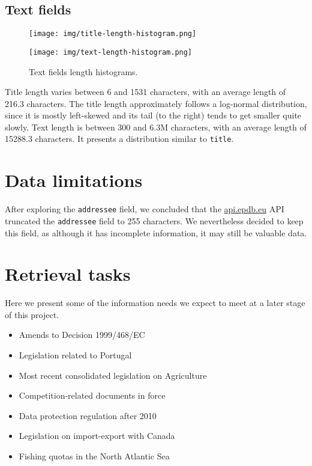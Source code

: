 \documentclass[sigconf, authorversion]{acmart}
\begin{document}
\subsection{Text fields}

\begin{figure}[h]
    \centering
    \begin{minipage}[t]{0.5\linewidth}
        \centering
        \texttt{[image: img/title-length-histogram.png]}
    \end{minipage}%
    \begin{minipage}[t]{0.5\linewidth}
        \centering
        \texttt{[image: img/text-length-histogram.png]}
    \end{minipage}
    \caption{Text fields length histograms.}
\end{figure}

Title length varies between 6 and 1531 characters, with an average length of 216.3 characters. The title length approximately follows a log-normal distribution, since it is mostly left-skewed and its tail (to the right) tends to get smaller quite slowly.
Text length is between 300 and 6.3M characters, with an average length of 15288.3 characters. It presents a distribution similar to \texttt{title}.

\section{Data limitations}

After exploring the \texttt{addressee} field, we concluded that the \url{api.epdb.eu} API truncated the \texttt{addressee} field to 255 characters. We nevertheless decided to keep this field, as although it has incomplete information, it may still be valuable data.

\section{Retrieval tasks}
\label{sec:retrieval tasks}

Here we present some of the information needs we expect to meet at a later stage of this project.

\begin{itemize}
    \item Amends to Decision 1999/468/EC
    \item Legislation related to Portugal
    \item Most recent consolidated legislation on Agriculture
    \item Competition-related documents in force
    \item Data protection regulation after 2010
    \item Legislation on import-export with Canada
    \item Fishing quotas in the North Atlantic Sea
\end{itemize}
\end{document}
